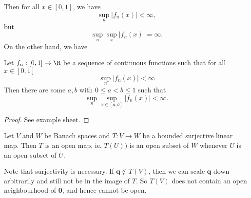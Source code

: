 \documentclass[a4paper]{article}
\begin{document}
Then for all $x\in [0, 1]$, we have
\[
  \sup_n |f_n(x)| < \infty,
\]
but
\[
  \sup_n \sup_x |f_n(x)| = \infty.
\]
On the other hand, we have
\begin{thm}[Osgood]
  Let $f_n: [0, 1] \to \R$ be a sequence of continuous functions such that for all $x\in [0, 1]$
  \[
    \sup_n |f_n(x)| < \infty
  \]
  Then there are some $a, b$ with $0 \leq a < b \leq 1$ such that
  \[
    \sup_n \sup_{x\in [a, b]} |f_n(x)| < \infty.
  \]
\end{thm}

\begin{proof}
  See example sheet.
\end{proof}

\begin{thm}
  Let $V$ and $W$ be Banach spaces and $T: V\to W$ be a bounded surjective linear map. Then $T$ is an open map, ie. $T(U))$ is an open subset of $W$ whenever $U$ is an open subset of $U$.
\end{thm}

Note that surjectivity is necessary. If $\mathbf{q}\not\in T(V)$, then we can scale $\mathbf{q}$ down arbitrarily and still not be in the image of $T$. So $T(V)$ does not contain an open neighbourhood of $\mathbf{0}$, and hence cannot be open.
\end{document}
